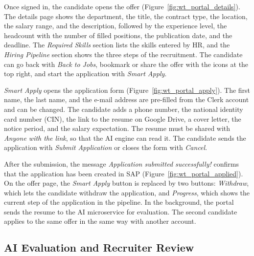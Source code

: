 
Once signed in, the candidate opens the offer (Figure~\ref{fig:wt_portal_details}). The details page shows the department, the title, the contract type, the location, the salary range, and the description, followed by the experience level, the headcount with the number of filled positions, the publication date, and the deadline. The \emph{Required Skills} section lists the skills entered by HR, and the \emph{Hiring Pipeline} section shows the three steps of the recruitment. The candidate can go back with \emph{Back to Jobs}, bookmark or share the offer with the icons at the top right, and start the application with \emph{Smart Apply}.


\emph{Smart Apply} opens the application form (Figure~\ref{fig:wt_portal_apply}). The first name, the last name, and the e-mail address are pre-filled from the Clerk account and can be changed. The candidate adds a phone number, the national identity card number (CIN), the link to the resume on Google Drive, a cover letter, the notice period, and the salary expectation. The resume must be shared with \emph{Anyone with the link}, so that the AI engine can read it. The candidate sends the application with \emph{Submit Application} or closes the form with \emph{Cancel}.


After the submission, the message \emph{Application submitted successfully!} confirms that the application has been created in SAP (Figure~\ref{fig:wt_portal_applied}). On the offer page, the \emph{Smart Apply} button is replaced by two buttons: \emph{Withdraw}, which lets the candidate withdraw the application, and \emph{Progress}, which shows the current step of the application in the pipeline. In the background, the portal sends the resume to the AI microservice for evaluation. The second candidate applies to the same offer in the same way with another account.

\subsection{AI Evaluation and Recruiter Review}
\label{subsec:wt_ai}

